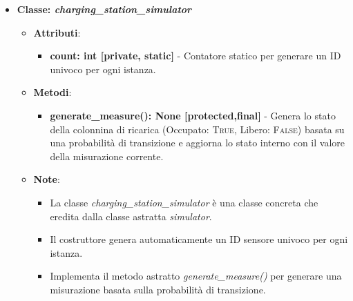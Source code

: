 \begin{itemize}
    \item{\textbf{Classe: \textit{charging\_station\_simulator}}}
    \begin{itemize}
        \item \textbf{Attributi}: 
        \begin{itemize}
            \item \textbf{count: int [private, static]} - Contatore statico per generare un ID univoco per ogni istanza.
        \end{itemize}
        \item \textbf{Metodi}:
        \begin{itemize}
            \item \textbf{generate\_measure(): None [protected,final]} - Genera lo stato della colonnina di ricarica (Occupato: \textsc{True}, Libero: \textsc{False}) basata su una probabilità di transizione e aggiorna lo stato interno con il valore della misurazione corrente.
        \end{itemize}
        \item \textbf{Note}:
        \begin{itemize}
            \item La classe \textit{charging\_station\_simulator} è una classe concreta che eredita dalla classe astratta \textit{simulator}.
            \item Il costruttore genera automaticamente un ID sensore univoco per ogni istanza.
            \item Implementa il metodo astratto \textit{generate\_measure()} per generare una misurazione basata sulla probabilità di transizione.
        \end{itemize}
    \end{itemize}


\end{itemize}
